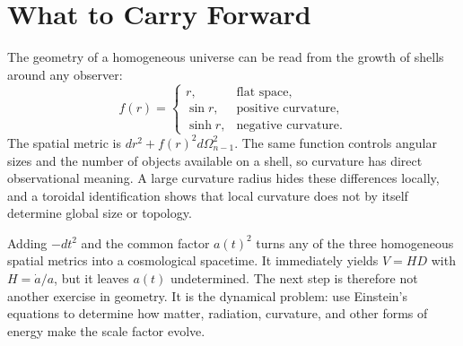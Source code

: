 \section{What to Carry Forward}

The geometry of a homogeneous universe can be read from the growth of shells around any observer:
\begin{equation}
f(r)=
\begin{cases}
r, & \text{flat space},\\
\sin r, & \text{positive curvature},\\
\sinh r, & \text{negative curvature}.
\end{cases}
\end{equation}
The spatial metric is \(dr^2+f(r)^2d\Omega_{n-1}^2\). The same function controls angular sizes and the number of objects available on a shell, so curvature has direct observational meaning. A large curvature radius hides these differences locally, and a toroidal identification shows that local curvature does not by itself determine global size or topology.

Adding \(-dt^2\) and the common factor \(a(t)^2\) turns any of the three homogeneous spatial metrics into a cosmological spacetime. It immediately yields \(V=HD\) with \(H=\dot a/a\), but it leaves \(a(t)\) undetermined. The next step is therefore not another exercise in geometry. It is the dynamical problem: use Einstein's equations to determine how matter, radiation, curvature, and other forms of energy make the scale factor evolve.
